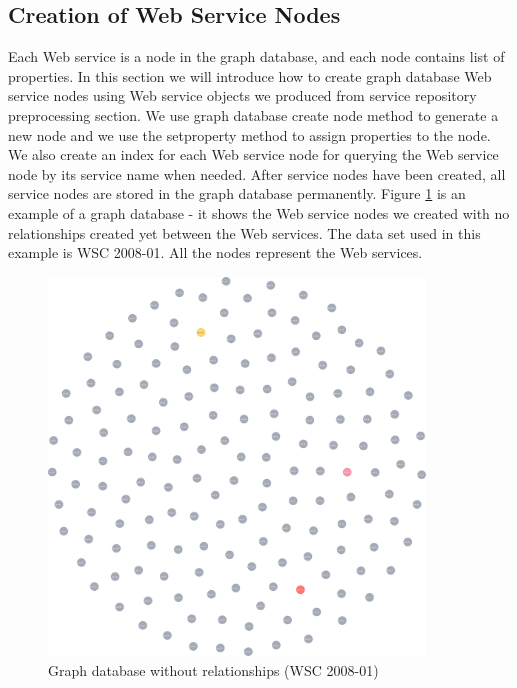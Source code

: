 \subsection{Creation of Web Service Nodes}
Each Web service is a node in the graph database, and each node contains list of properties. In this section we will introduce how to create graph database Web service nodes using Web service objects we produced from service repository preprocessing section. We use graph database create node method to generate a new node and we use the setproperty method to assign properties to the node. We also create an index for each Web service node for querying the Web service node by its service name when needed. After service nodes have been created, all service nodes are stored in the graph database permanently.  Figure \ref{fig:noRelationships} is an example of a graph database - it shows the Web service nodes we created with no relationships created yet between the Web services. The data set used in this example is WSC 2008-01. All the nodes represent the Web services. 
\begin{figure}[H]
\includegraphics[width=10cm]{service-without-relationships.pdf}
\centering
\caption{Graph database without relationships (WSC 2008-01)}
\label{fig:noRelationships} 
\end{figure} 
